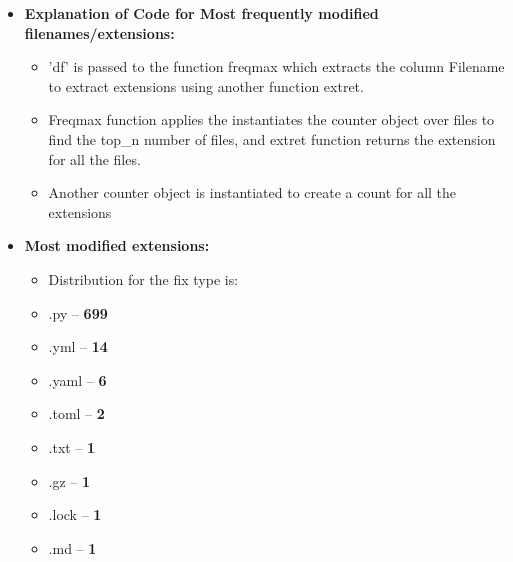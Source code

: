 \documentclass[12pt, a4paper]{report}
\begin{document}
\begin{itemize}
        \begin{itemize}
            \item \textbf{Explanation of Code for Most frequently modified filenames/extensions:}
            \begin{itemize}
                \item 'df' is passed to the function freqmax which extracts the column Filename to extract extensions using another function extret.
                \item Freqmax function applies the instantiates the counter object over files to find the top\_n number of files, and extret function returns the extension for all the files.
                \item Another counter object is instantiated to create a count for all the extensions
            \end{itemize}
        \end{itemize}

        \begin{itemize}
            \item \textbf{Most modified extensions:}
            \begin{itemize}
                \item Distribution for the fix type is:
                \item {.py} -- \textbf{699}
                \item {.yml} -- \textbf{14}
                \item {.yaml} -- \textbf{6}
                \item {.toml} -- \textbf{2}
                \item {.txt} -- \textbf{1}
                \item {.gz} -- \textbf{1}
                \item {.lock} -- \textbf{1}
                \item {.md} -- \textbf{1}
            \end{itemize}


\end{itemize}
\end{itemize}
\end{document}
